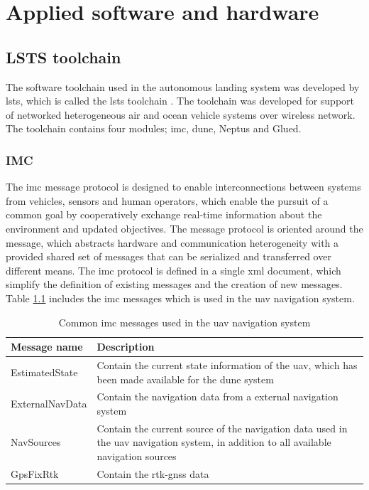 \chapter{Applied software and hardware}
\section{LSTS toolchain}
The software toolchain used in the autonomous landing system was developed by \gls{lsts}, which is called the \gls{lsts} toolchain \citep{pinto2013lsts}. The toolchain was developed for support of networked heterogeneous air and ocean vehicle systems over wireless network. The toolchain contains four modules; \gls{imc}, \gls{dune}, Neptus and Glued.
\subsection{IMC}
The \acrfull{imc} message protocol \citep{martins2009imc} is designed to enable interconnections between systems from vehicles, sensors and human operators, which enable the pursuit of a common goal by cooperatively exchange real-time information about the environment and updated objectives. The message protocol is oriented around the message, which abstracts hardware and communication heterogeneity with a provided shared set of messages that can be serialized and transferred over different means. The \gls{imc} protocol is defined in a single \gls{xml} document, which simplify the definition of existing messages and the creation of new messages. Table \ref{Tb:IMCmessages} includes the \gls{imc} messages which is used in the \gls{uav} navigation system.
\newpage
\begin{table}[H]
\centering
\begin{tabular}{| p{2.5cm} | p{9cm} |}
\hline
\textbf{Message name} & \textbf{Description} \\ \hline
EstimatedState	& Contain the current state information of the \gls{uav}, which has been made available for the \gls{dune} system	\\ \hline
ExternalNavData & Contain the navigation data from a external navigation system	\\ \hline
NavSources		& Contain the current source of the navigation data used in the \gls{uav} navigation system, in addition to all available navigation sources\\ \hline
GpsFixRtk		& Contain the \gls{rtk-gnss} data \\ \hline
\end{tabular}
\caption{Common \gls{imc} messages used in the \gls{uav} navigation system}
\label{Tb:IMCmessages}
\end{table}
